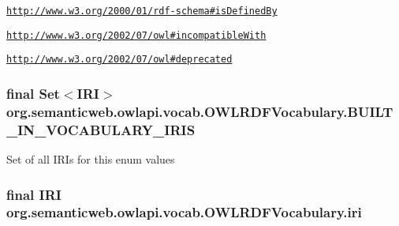  \href{http://www.w3.org/2000/01/rdf-schema#isDefinedBy}{\tt http\-://www.\-w3.\-org/2000/01/rdf-\/schema\#is\-Defined\-By} \par
 \href{http://www.w3.org/2002/07/owl#incompatibleWith}{\tt http\-://www.\-w3.\-org/2002/07/owl\#incompatible\-With} \par
 \href{http://www.w3.org/2002/07/owl#deprecated}{\tt http\-://www.\-w3.\-org/2002/07/owl\#deprecated} \hypertarget{enumorg_1_1semanticweb_1_1owlapi_1_1vocab_1_1_o_w_l_r_d_f_vocabulary_ab6ac216cb2af656a8ded69c04a3b66c5}{
\subsubsection[{B\-U\-I\-L\-T\-\_\-\-I\-N\-\_\-\-V\-O\-C\-A\-B\-U\-L\-A\-R\-Y\-\_\-\-I\-R\-I\-S}]{\setlength{\rightskip}{0pt plus 5cm}final Set$<${\bf I\-R\-I}$>$ org.\-semanticweb.\-owlapi.\-vocab.\-O\-W\-L\-R\-D\-F\-Vocabulary.\-B\-U\-I\-L\-T\-\_\-\-I\-N\-\_\-\-V\-O\-C\-A\-B\-U\-L\-A\-R\-Y\-\_\-\-I\-R\-I\-S\hspace{0.3cm}{\ttfamily [static]}}}\label{enumorg_1_1semanticweb_1_1owlapi_1_1vocab_1_1_o_w_l_r_d_f_vocabulary_ab6ac216cb2af656a8ded69c04a3b66c5}
Set of all I\-R\-Is for this enum values \hypertarget{enumorg_1_1semanticweb_1_1owlapi_1_1vocab_1_1_o_w_l_r_d_f_vocabulary_aa071b3e49a37959eca1dabaad8aa1fa8}{
\subsubsection[{iri}]{\setlength{\rightskip}{0pt plus 5cm}final {\bf I\-R\-I} org.\-semanticweb.\-owlapi.\-vocab.\-O\-W\-L\-R\-D\-F\-Vocabulary.\-iri}}\label{enumorg_1_1semanticweb_1_1owlapi_1_1vocab_1_1_o_w_l_r_d_f_vocabulary_aa071b3e49a37959eca1dabaad8aa1fa8}
